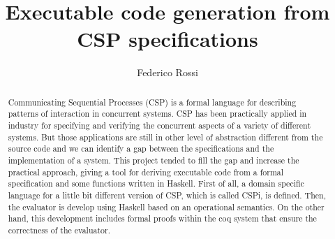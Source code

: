 \documentclass{comjnl}
\begin{document}
\title[Executable code generation from CSP specifications]{Executable code generation from CSP specifications}
\author{Federico Rossi}
 




\begin{abstract}
Communicating Sequential Processes (CSP) is a formal language for describing
patterns of interaction in concurrent systems. CSP has been practically applied
in industry for specifying and verifying the concurrent aspects of a
variety of different systems. But those applications are still in other level of
abstraction different from the source code and we can identify a gap between the
specifications and the implementation of a system. This project tended to fill the gap
and increase the practical approach, giving a tool for deriving executable code from a
formal specification and some functions written in Haskell. First of all, a domain 
specific language for a little bit different version of CSP, which is called CSPi, is
defined. Then, the evaluator is develop using Haskell based on an operational semantics.
On the other hand, this development includes formal proofs within the coq system that 
ensure the correctness of the evaluator.
\end{abstract}

\maketitle
\end{document}
